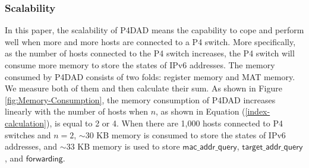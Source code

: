 \documentclass[journal]{IEEEtran}
\begin{document}
        \subsubsection{Scalability}\label{sec:scalability}
            In this paper, the scalability of P4DAD means the capability to cope and perform well when more and more hosts are connected to a P4 switch. More specifically, as the number of hosts connected to the P4 switch increases, the P4 switch will consume more memory to store the states of IPv6 addresses.
            The memory consumed by P4DAD consists of two folds: register memory and MAT memory. 
            We measure both of them and then calculate their sum.
            As shown in Figure \ref{fig:Memory-Consumption}, the memory consumption of P4DAD increases linearly with the number of hosts when $n$, as shown in Equation (\ref{index-calculation}), is equal to 2 or 4. When there are 1,000 hosts connected to P4 switches and $n=2$, $\sim$30 KB memory is consumed to store the states of IPv6 addresses, and $\sim$33 KB memory is used to store $\mathsf{mac\_addr\_query}$, $\mathsf{target\_addr\_query}$, and $\mathsf{forwarding}$.
            
\end{document}
